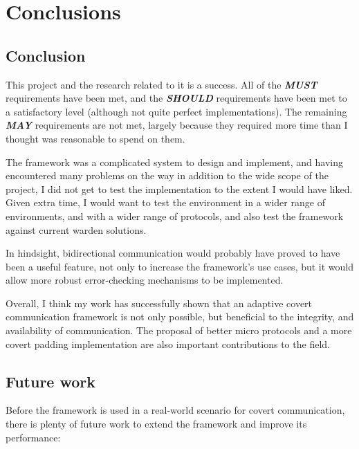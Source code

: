 \chapter{Conclusions}
\section{Conclusion}

This project and the research related to it is a success. All of the \textbf{\textit{MUST}} requirements have been met, and the \textbf{\textit{SHOULD}} requirements have been met to a satisfactory level (although not quite perfect implementations). The remaining \textbf{\textit{MAY}} requirements are not met, largely because they required more time than I thought was reasonable to spend on them.

The framework was a complicated system to design and implement, and having encountered many problems on the way in addition to the wide scope of the project, I did not get to test the implementation to the extent I would have liked. Given extra time, I would want to test the environment in a wider range of environments, and with a wider range of protocols, and also test the framework against current warden solutions.

In hindsight, bidirectional communication would probably have proved to have been a useful feature, not only to increase the framework's use cases, but it would allow more robust error-checking mechanisms to be implemented.

Overall, I think my work has successfully shown that an adaptive covert communication framework is not only possible, but beneficial to the integrity, and availability of communication. The proposal of better micro protocols and a more covert padding implementation are also important contributions to the field.

\section{Future work}

Before the framework is used in a real-world scenario for covert communication, there is plenty of future work to extend the framework and improve its performance:

